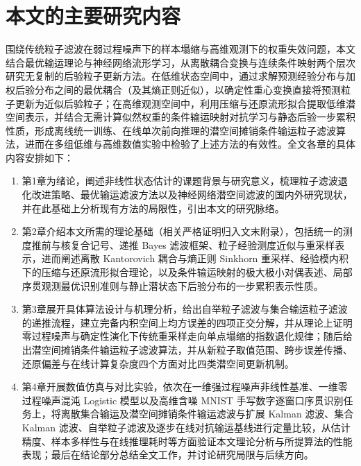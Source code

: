\section{本文的主要研究内容}

围绕传统粒子滤波在弱过程噪声下的样本塌缩与高维观测下的权重失效问题，本文结合最优输运理论与神经网络流形学习，从离散耦合变换与连续条件映射两个层次研究无复制的后验粒子更新方法。在低维状态空间中，通过求解预测经验分布与加权后验分布之间的最优耦合（及其熵正则近似），以确定性重心变换直接将预测粒子更新为近似后验粒子；在高维观测空间中，利用压缩与还原流形拟合提取低维潜空间表示，并结合无需计算似然权重的条件输运映射对抗学习与静态后验一步累积性质，形成离线统一训练、在线单次前向推理的潜空间摊销条件输运粒子滤波算法，进而在多组低维与高维数值实验中检验了上述方法的有效性。全文各章的具体内容安排如下：
\begin{enumerate}[label=(\arabic*),leftmargin=0pt,labelindent=2\ccwd,itemindent=*,labelsep=0.4em,nosep]
  \item 第1章为绪论，阐述非线性状态估计的课题背景与研究意义，梳理粒子滤波退化改进策略、最优输运滤波方法以及神经网络潜空间滤波的国内外研究现状，并在此基础上分析现有方法的局限性，引出本文的研究脉络。
  \item 第2章介绍本文所需的理论基础（相关严格证明归入文末附录），包括统一的测度推前与核复合记号、递推 Bayes 滤波框架、粒子经验测度近似与重采样表示，进而阐述离散 Kantorovich 耦合与熵正则 Sinkhorn 重采样、经验模内积下的压缩与还原流形拟合理论，以及条件输运映射的极大极小对偶表述、局部序贯观测最优识别准则与静止潜状态下后验分布的一步累积表示性质。
  \item 第3章展开具体算法设计与机理分析，给出自举粒子滤波与集合输运粒子滤波的递推流程，建立完备内积空间上均方误差的四项正交分解，并从理论上证明零过程噪声与确定性演化下传统重采样走向单点塌缩的指数退化规律；随后给出潜空间摊销条件输运粒子滤波算法，并从新粒子取值范围、跨步误差传播、还原偏差与在线计算复杂度四个方面对比四类潜空间更新机制。
  \item 第4章开展数值仿真与对比实验，依次在一维强过程噪声非线性基准、一维零过程噪声混沌 Logistic 模型以及高维含噪 MNIST 手写数字逐窗口序贯识别任务上，将离散集合输运及潜空间摊销条件输运滤波与扩展 Kalman 滤波、集合 Kalman 滤波、自举粒子滤波及逐步在线对抗输运基线进行定量比较，从估计精度、样本多样性与在线推理耗时等方面验证本文理论分析与所提算法的性能表现；最后在结论部分总结全文工作，并讨论研究局限与后续方向。
\end{enumerate}
